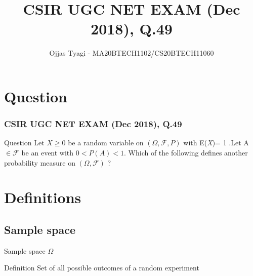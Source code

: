 \documentclass{beamer}
\title{CSIR UGC NET EXAM (Dec 2018), Q.49}
\author{Ojjas Tyagi - MA20BTECH1102/CS20BTECH11060}
\begin{document}
\begin{frame}
\titlepage
\end{frame}
\section{Question}
\begin{frame}
\frametitle{CSIR UGC NET EXAM (Dec 2018), Q.49}
\begin{block}{Question}
Let \(X \geq 0\) be a random variable on \(  (\Omega,\mathcal{F},P) \) with E(\emph{X})= 1 .Let A \(\in \mathcal{F}\) be an event with \(0<P(A)<1\). Which of the following defines another probability measure on \((\Omega,\mathcal{F})\) ?
\end{block}
\end{frame}
\section{Definitions}
\subsection{Sample space}
\begin{frame}{Sample space \(\Omega\)}
\begin{block}{Definition}
Set  of all possible outcomes of a random experiment
\end{block}
\end{frame}
\end{document}
